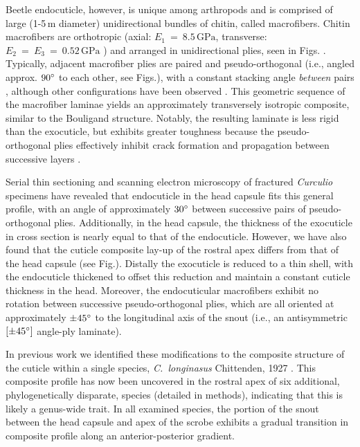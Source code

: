 \documentclass[twocolumn, linenumbers, superscriptaddress, nofootinbib]{revtex4-1}
\begin{document}
		Beetle endocuticle, however, is unique among arthropods and is comprised of large (1-5\,{\textmu}m diameter) unidirectional bundles of chitin, called macrofibers.
		Chitin macrofibers are orthotropic (axial: $E_1~=~8.5\,\text{GPa}$, transverse: $ E_2~=~E_3~=~0.52\,\text{GPa}$ \cite{Jansen2016}) and arranged in unidirectional plies, seen in Figs.  \cite{Kamp2010,Kamp2015}.
		Typically, adjacent macrofiber plies are paired and pseudo-orthogonal (i.e., angled approx. $90\degree$ to each other, see Figs.), with a constant stacking angle \emph{between} pairs , although other configurations have been observed \cite{Hepburn1973,Kamp2010}.
		This geometric sequence of the macrofiber laminae yields an approximately transversely isotropic composite, similar to the Bouligand structure.
		Notably, the resulting laminate is less rigid than the exocuticle, but exhibits greater toughness because the pseudo-orthogonal plies effectively inhibit crack formation and propagation between successive layers \cite{Kamp2010,Kamp2015,Hepburn1973}.
		
		Serial thin sectioning and scanning electron microscopy of fractured \textit{Curculio} specimens have revealed that endocuticle in the head capsule fits this general profile, with an angle of approximately $30\degree$ between successive pairs of pseudo-orthogonal plies.
		Additionally, in the head capsule, the thickness of the exocuticle in cross section is nearly equal to that of the endocuticle.
		However, we have also found that the cuticle composite lay-up of the rostral apex differs from that of the head capsule (see Fig.).
		Distally the exocuticle is reduced to a thin shell, with the endocuticle thickened  to offset this reduction and maintain a constant cuticle thickness in the head.
		Moreover, the endocuticular macrofibers exhibit no rotation between successive pseudo-orthogonal plies, which are all oriented at approximately $\pm45\degree$ to the longitudinal axis of the snout (i.e., an antisymmetric $[\pm45\degree]$ angle-ply laminate).
		
		In previous work we identified these modifications to the composite structure of the cuticle within a single species, \textit{C.~longinasus} Chittenden, 1927 \cite{Jansen2016, Singh2016}.
		This composite profile has now been uncovered in the rostral apex of six additional, phylogenetically disparate, species (detailed in methods), indicating that this is likely a genus-wide trait.
		In all examined species, the portion of the snout between the head capsule and apex of the scrobe exhibits a gradual transition in composite profile along an anterior-posterior gradient.
		
\end{document}
